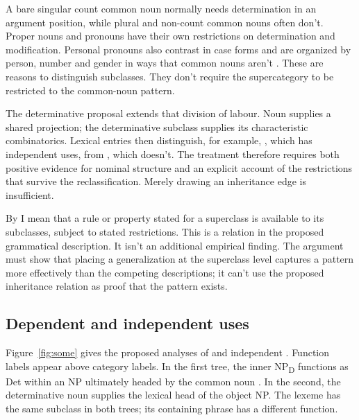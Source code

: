 \documentclass[12pt]{article}
\begin{document}
A bare singular count common noun normally needs determination in an argument position, while plural and non-count common nouns often don't. Proper nouns and pronouns have their own restrictions on determination and modification. Personal pronouns also contrast in case forms and are organized by person, number and gender in ways that common nouns aren't \citep[425--427]{huddleston2002}. These are reasons to distinguish subclasses. They don't require the supercategory to be restricted to the common-noun pattern.

The determinative proposal extends that division of labour. Noun supplies a shared projection; the determinative subclass supplies its characteristic combinatorics. Lexical entries then distinguish, for example, , which has independent uses, from , which doesn't. The treatment therefore requires both positive evidence for nominal structure and an explicit account of the restrictions that survive the reclassification. Merely drawing an inheritance edge is insufficient.

By  I mean that a rule or property stated for a superclass is available to its subclasses, subject to stated restrictions. This is a relation in the proposed grammatical description. It isn't an additional empirical finding. The argument must show that placing a generalization at the superclass level captures a pattern more effectively than the competing descriptions; it can't use the proposed inheritance relation as proof that the pattern exists.

\subsection{Dependent and independent uses}

Figure~\ref{fig:some} gives the proposed analyses of  and independent . Function labels appear above category labels. In the first tree, the inner NP\textsubscript{D} functions as Det within an NP ultimately headed by the common noun . In the second, the determinative noun  supplies the lexical head of the object NP. The lexeme has the same subclass in both trees; its containing phrase has a different function.
\end{document}
